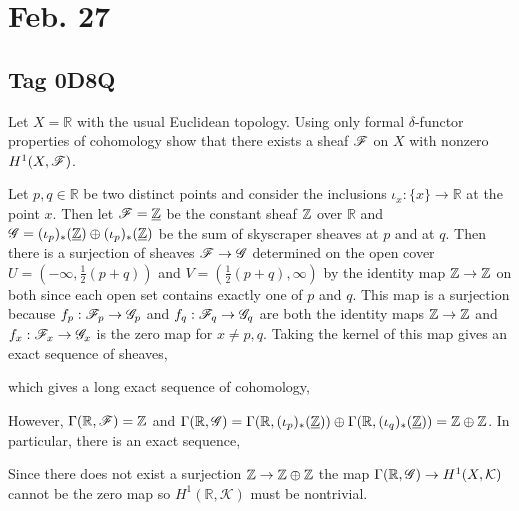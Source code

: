\documentclass[12pt]{article}
\begin{document}
\section{Feb. 27}

\subsection{Tag 0D8Q}

\newcommand{\R}{\mathbb{R}}

\begin{exr}
Let $X = \R$ with the usual Euclidean topology. Using only formal $\delta$-functor properties of cohomology show that there exists a sheaf $\mathscr{F}$ on $X$ with nonzero $H^1(X, \mathscr{F})$.
\end{exr}

Let $p, q \in \R$ be two distinct points and consider the inclusions $\iota_x : \{ x \} \to \R$ at the point $x$. Then let $\mathscr{F} = \underline{\mathbb{Z}}$ be the constant sheaf $\mathbb{Z}$ over $\R$ and $\mathscr{G} = (\iota_p)_*(\underline{\mathbb{Z}}) \oplus (\iota_p)_*(\underline{\mathbb{Z}})$ be the sum of skyscraper sheaves at $p$ and at $q$. Then there is a surjection of sheaves $\mathscr{F} \to \mathscr{G}$ determined on the open cover $U = (-\infty, \tfrac{1}{2}(p + q))$ and $V = (\tfrac{1}{2}(p + q), \infty)$ by the identity map $\mathbb{Z} \to \mathbb{Z}$ on both since each open set contains exactly one of $p$ and $q$. This map is a surjection because $f_p : \mathscr{F}_p \to \mathscr{G}_p$ and $f_q : \mathscr{F}_q \to \mathscr{G}_q$ are both the identity maps $\mathbb{Z} \to \mathbb{Z}$ and $f_x : \mathscr{F}_x \to \mathscr{G}_x$ is the zero map for $x \neq p,q$. Taking the kernel of this map gives an exact sequence of sheaves,
\begin{center}
\end{center}
which gives a long exact sequence of cohomology,
\begin{center}
\end{center}
However, $\Gamma(\R, \F) = \Z$ and $\Gamma(\R, \G) = \Gamma(\R, (\iota_p)_*(\underline{\Z})) \oplus \Gamma(\R, (\iota_q)_*(\underline{\Z})) = \Z \oplus \Z$. In particular, there is an exact sequence,
\begin{center}
\end{center}
Since there does not exist a surjection $\mathbb{Z} \to \mathbb{Z} \oplus \mathbb{Z}$ the map $\Gamma(\R, \G) \to H^1(X, \mathcal{K})$ cannot be the zero map so $H^1(\R, \mathcal{K})$ must be nontrivial. 
\end{document}
